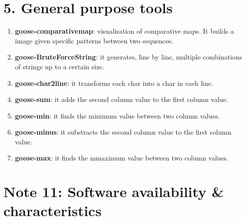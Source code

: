 \documentclass[11pt,journal,compsoc]{report}[1]
\begin{document}
\chapter*{5. General purpose tools}
\label{seq}

\begin{enumerate}
\item \textbf{goose-comparativemap}: visualisation of comparative maps. It builds a image given specific patterns between two sequences.
\item \textbf{goose-BruteForceString}: it generates, line by line, multiple combinations of strings up to a certain size.
\item \textbf{goose-char2line}: it transforms each char into a char in each line.
\item \textbf{goose-sum}: it adds the second column value to the first column value.
\item \textbf{goose-min}: it finds the minimum value between two column values.
\item \textbf{goose-minus}: it substracts the second column value to the first column value.
\item \textbf{goose-max}: it finds the mmaximum value between two column values.
\end{enumerate}



\chapter*{Note 11: Software availability \& characteristics}
\label{C-SOFTWARE}
\end{document}
